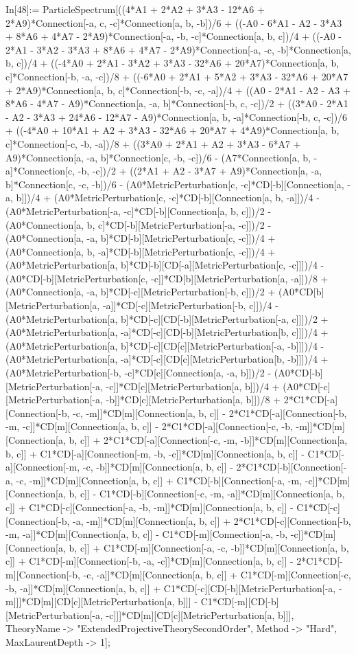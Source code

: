 In[48]:= ParticleSpectrum[((4*A1 + 2*A2 + 3*A3 - 12*A6 + 2*A9)*Connection[-a, c, -c]*Connection[a, b, -b])/6 + ((-A0 - 6*A1 - A2 - 3*A3 + 8*A6 + 4*A7 - 2*A9)*Connection[-a, -b, -c]*Connection[a, b, c])/4 + ((-A0 - 2*A1 - 3*A2 - 3*A3 + 8*A6 + 4*A7 - 2*A9)*Connection[-a, -c, -b]*Connection[a, b, c])/4 + ((-4*A0 + 2*A1 - 3*A2 + 3*A3 - 32*A6 + 20*A7)*Connection[a, b, c]*Connection[-b, -a, -c])/8 + ((-6*A0 + 2*A1 + 5*A2 + 3*A3 - 32*A6 + 20*A7 + 2*A9)*Connection[a, b, c]*Connection[-b, -c, -a])/4 + ((A0 - 2*A1 - A2 - A3 + 8*A6 - 4*A7 - A9)*Connection[a, -a, b]*Connection[-b, c, -c])/2 + ((3*A0 - 2*A1 - A2 - 3*A3 + 24*A6 - 12*A7 - A9)*Connection[a, b, -a]*Connection[-b, c, -c])/6 + ((-4*A0 + 10*A1 + A2 + 3*A3 - 32*A6 + 20*A7 + 4*A9)*Connection[a, b, c]*Connection[-c, -b, -a])/8 + ((3*A0 + 2*A1 + A2 + 3*A3 - 6*A7 + A9)*Connection[a, -a, b]*Connection[c, -b, -c])/6 - (A7*Connection[a, b, -a]*Connection[c, -b, -c])/2 + ((2*A1 + A2 - 3*A7 + A9)*Connection[a, -a, b]*Connection[c, -c, -b])/6 - (A0*MetricPerturbation[c, -c]*CD[-b][Connection[a, -a, b]])/4 + (A0*MetricPerturbation[c, -c]*CD[-b][Connection[a, b, -a]])/4 - (A0*MetricPerturbation[-a, -c]*CD[-b][Connection[a, b, c]])/2 - (A0*Connection[a, b, c]*CD[-b][MetricPerturbation[-a, -c]])/2 - (A0*Connection[a, -a, b]*CD[-b][MetricPerturbation[c, -c]])/4 + (A0*Connection[a, b, -a]*CD[-b][MetricPerturbation[c, -c]])/4 + (A0*MetricPerturbation[a, b]*CD[-b][CD[-a][MetricPerturbation[c, -c]]])/4 - (A0*CD[-b][MetricPerturbation[c, -c]]*CD[b][MetricPerturbation[a, -a]])/8 + (A0*Connection[a, -a, b]*CD[-c][MetricPerturbation[-b, c]])/2 + (A0*CD[b][MetricPerturbation[a, -a]]*CD[-c][MetricPerturbation[-b, c]])/4 - (A0*MetricPerturbation[a, b]*CD[-c][CD[-b][MetricPerturbation[-a, c]]])/2 + (A0*MetricPerturbation[a, -a]*CD[-c][CD[-b][MetricPerturbation[b, c]]])/4 + (A0*MetricPerturbation[a, b]*CD[-c][CD[c][MetricPerturbation[-a, -b]]])/4 - (A0*MetricPerturbation[a, -a]*CD[-c][CD[c][MetricPerturbation[b, -b]]])/4 + (A0*MetricPerturbation[-b, -c]*CD[c][Connection[a, -a, b]])/2 - (A0*CD[-b][MetricPerturbation[-a, -c]]*CD[c][MetricPerturbation[a, b]])/4 + (A0*CD[-c][MetricPerturbation[-a, -b]]*CD[c][MetricPerturbation[a, b]])/8 + 2*C1*CD[-a][Connection[-b, -c, -m]]*CD[m][Connection[a, b, c]] - 2*C1*CD[-a][Connection[-b, -m, -c]]*CD[m][Connection[a, b, c]] - 2*C1*CD[-a][Connection[-c, -b, -m]]*CD[m][Connection[a, b, c]] + 2*C1*CD[-a][Connection[-c, -m, -b]]*CD[m][Connection[a, b, c]] + C1*CD[-a][Connection[-m, -b, -c]]*CD[m][Connection[a, b, c]] - C1*CD[-a][Connection[-m, -c, -b]]*CD[m][Connection[a, b, c]] - 2*C1*CD[-b][Connection[-a, -c, -m]]*CD[m][Connection[a, b, c]] + C1*CD[-b][Connection[-a, -m, -c]]*CD[m][Connection[a, b, c]] - C1*CD[-b][Connection[-c, -m, -a]]*CD[m][Connection[a, b, c]] + C1*CD[-c][Connection[-a, -b, -m]]*CD[m][Connection[a, b, c]] - C1*CD[-c][Connection[-b, -a, -m]]*CD[m][Connection[a, b, c]] + 2*C1*CD[-c][Connection[-b, -m, -a]]*CD[m][Connection[a, b, c]] - C1*CD[-m][Connection[-a, -b, -c]]*CD[m][Connection[a, b, c]] + C1*CD[-m][Connection[-a, -c, -b]]*CD[m][Connection[a, b, c]] + C1*CD[-m][Connection[-b, -a, -c]]*CD[m][Connection[a, b, c]] - 2*C1*CD[-m][Connection[-b, -c, -a]]*CD[m][Connection[a, b, c]] + C1*CD[-m][Connection[-c, -b, -a]]*CD[m][Connection[a, b, c]] + C1*CD[-c][CD[-b][MetricPerturbation[-a, -m]]]*CD[m][CD[c][MetricPerturbation[a, b]]] - C1*CD[-m][CD[-b][MetricPerturbation[-a, -c]]]*CD[m][CD[c][MetricPerturbation[a, b]]], TheoryName -> "ExtendedProjectiveTheorySecondOrder", Method -> "Hard", MaxLaurentDepth -> 1]; 
